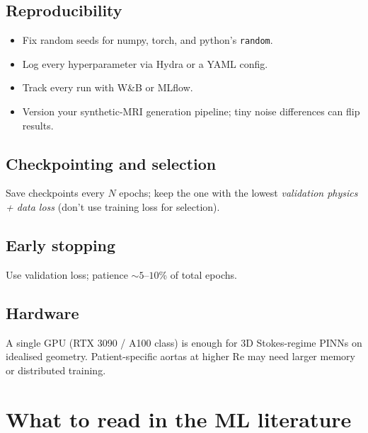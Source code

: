 \documentclass[11pt]{article}
\begin{document}
\subsection*{Reproducibility}
\begin{itemize}[noitemsep]
\item Fix random seeds for numpy, torch, and python's \texttt{random}.
\item Log every hyperparameter via Hydra or a YAML config.
\item Track every run with W\&B or MLflow.
\item Version your synthetic-MRI generation pipeline; tiny noise differences can flip results.
\end{itemize}

\subsection*{Checkpointing and selection}
Save checkpoints every $N$ epochs; keep the one with the lowest \emph{validation physics + data loss} (don't use training loss for selection).

\subsection*{Early stopping}
Use validation loss; patience $\sim 5$--$10$\% of total epochs.

\subsection*{Hardware}
A single GPU (RTX 3090 / A100 class) is enough for 3D Stokes-regime PINNs on idealised geometry. Patient-specific aortas at higher Re may need larger memory or distributed training.

\section{What to read in the ML literature}
\end{document}
